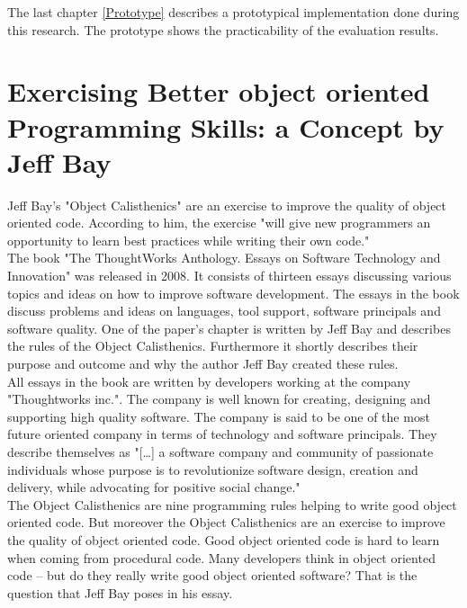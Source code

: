 The last chapter \ref{Prototype} describes a prototypical implementation done during this research. The prototype shows the practicability of the evaluation results.

\section{Exercising Better object oriented Programming Skills: a Concept by Jeff Bay}
\label{i:exercising}
Jeff Bay's "Object Calisthenics" \cite{bay2008} are an exercise to improve the quality of object oriented code. According to him, the exercise "will give new programmers an opportunity to learn best practices while writing their own code." \cite[p. 70]{bay2008}\\

The book "The ThoughtWorks Anthology. Essays on Software Technology and Innovation" \cite[p. 70-79]{oc2008} was released in 2008. It consists of thirteen essays discussing various topics and ideas on how to improve software development. The essays in the book discuss problems and ideas on languages, tool support, software principals and software quality. One of the paper's chapter is written by Jeff Bay and describes the rules of the Object Calisthenics. Furthermore it shortly describes their purpose and outcome and why the author Jeff Bay created these rules.\\

All essays in the book \cite{oc2008} are written by developers working at the company "Thoughtworks inc.". The company is well known for creating, designing and supporting high quality software. The company is said to be one of the most future oriented company in terms of technology and software principals. They describe themselves as "[\dots] a software company and community of passionate individuals whose purpose is to revolutionize software design, creation and delivery, while advocating for positive social change." \cite{twWeb}\\

The Object Calisthenics are nine programming rules helping to write good object oriented code. But moreover the Object Calisthenics are an exercise to improve the quality of object oriented code. Good object oriented code is hard to learn when coming from procedural code. Many developers think in object oriented code – but do they really write good object oriented software? That is the question that Jeff Bay poses in his essay.\\

